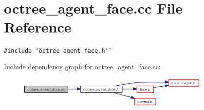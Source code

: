 \section{octree\_\-agent\_\-face.cc File Reference}
\label{octree__agent__face_8cc}
{\tt \#include \char`\"{}octree\_\-agent\_\-face.h\char`\"{}}\par


Include dependency graph for octree\_\-agent\_\-face.cc:\begin{figure}[H]
\begin{center}
\leavevmode
\includegraphics[width=272pt]{octree__agent__face_8cc__incl}
\end{center}
\end{figure}
